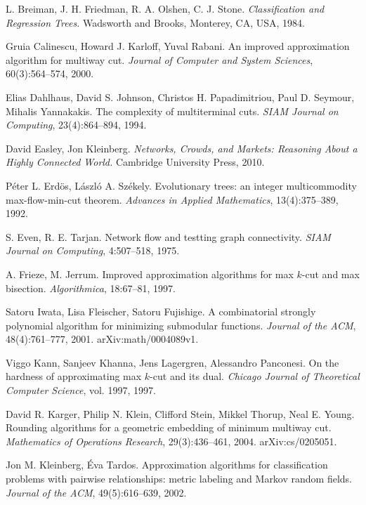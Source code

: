 \documentclass[11pt]{article}
\begin{document}
\begin{thebibliography}{99}

L. Breiman, J. H. Friedman, R. A. Olshen, C. J. Stone.
{\em Classification and Regression Trees.}
Wadsworth and Brooks, Monterey, CA, USA, 1984.

Gruia Calinescu, Howard J. Karloff, Yuval Rabani.
An improved approximation algorithm for multiway cut.
{\em Journal of Computer and System Sciences},
60(3):564--574, 2000.

Elias Dahlhaus, David S. Johnson, Christos H. Papadimitriou, Paul D. Seymour,
Mihalis Yannakakis.
The complexity of multiterminal cuts.
{\em SIAM Journal on Computing},
23(4):864--894, 1994.

David Easley, Jon Kleinberg.
{\em Networks, Crowds, and Markets: Reasoning About a Highly Connected World.}
Cambridge University Press, 2010.

P\'eter L. Erd\"os, L\'aszl\'o A. Sz\'ekely.
Evolutionary trees: an integer multicommodity max-flow-min-cut theorem.
{\em Advances in Applied Mathematics},
13(4):375--389, 1992.

S. Even, R. E. Tarjan.
Network flow and testting graph connectivity.
{\em SIAM Journal on Computing},
4:507--518, 1975.

A. Frieze, M. Jerrum.
Improved approximation algorithms for max $k$-cut and max bisection.
{\em Algorithmica}, 18:67--81, 1997.

Satoru Iwata, Lisa Fleischer, Satoru Fujishige.
A combinatorial strongly polynomial algorithm for minimizing submodular functions.
{\em Journal of the ACM}, 48(4):761--777, 2001.
arXiv:math/0004089v1.

Viggo Kann, Sanjeev Khanna, Jens Lagergren, Alessandro Panconesi.
On the hardness of approximating max $k$-cut and its dual.
{\em Chicago Journal of Theoretical Computer Science}, vol. 1997, 1997.

David R. Karger, Philip N. Klein, Clifford Stein, Mikkel Thorup, Neal E. Young.
Rounding algorithms for a geometric embedding of minimum multiway cut.
{\em Mathematics of Operations Research},
29(3):436--461, 2004.
arXiv:cs/0205051.

Jon M. Kleinberg, \'Eva Tardos.
Approximation algorithms for classification problems with pairwise relationships:
metric labeling and Markov random fields.
{\em Journal of the ACM},
49(5):616--639, 2002.


\end{thebibliography}
\end{document}
